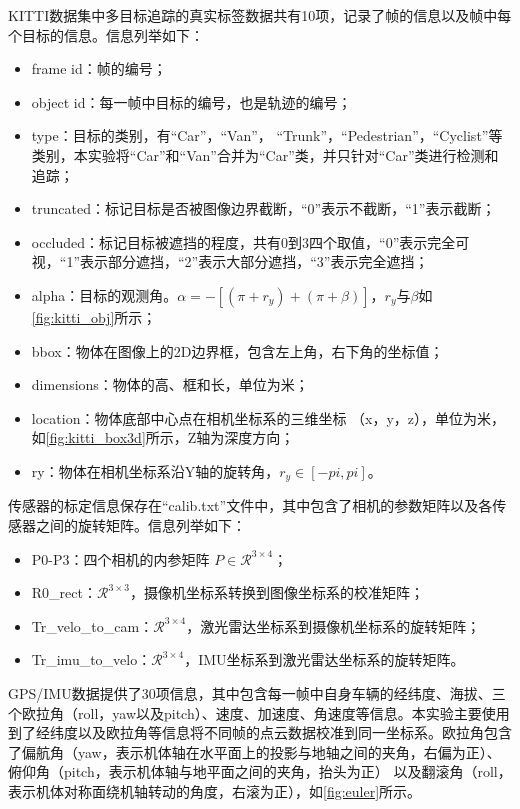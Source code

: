KITTI数据集中多目标追踪的真实标签数据共有10项，记录了帧的信息以及帧中每个目标的信息。信息列举如下：
\begin{itemize}
	\item frame id：帧的编号；
	\item object id：每一帧中目标的编号，也是轨迹的编号；
	\item type：目标的类别，有“Car”，“Van”， “Trunk”，“Pedestrian”，“Cyclist”等类别，本实验将“Car”和“Van”合并为“Car”类，并只针对“Car”类进行检测和追踪；
	\item truncated：标记目标是否被图像边界截断，“0”表示不截断，“1”表示截断；
	\item occluded：标记目标被遮挡的程度，共有0到3四个取值，“0”表示完全可视，“1”表示部分遮挡，“2”表示大部分遮挡，“3”表示完全遮挡；
	\item alpha：目标的观测角。$\alpha = -[(\pi+r_y) + (\pi+\beta)]$，$r_y$与$\beta$如\figurename \ref{fig:kitti_obj}所示；
	\item bbox：物体在图像上的2D边界框，包含左上角，右下角的坐标值；
	\item dimensions：物体的高、框和长，单位为米；
	\item location：物体底部中心点在相机坐标系的三维坐标 （x，y，z），单位为米，如\figurename \ref{fig:kitti_box3d}所示，Z轴为深度方向；
	\item ry：物体在相机坐标系沿Y轴的旋转角，$r_y \in [-pi, pi]$。
\end{itemize}



传感器的标定信息保存在“calib.txt”文件中，其中包含了相机的参数矩阵以及各传感器之间的旋转矩阵。信息列举如下：
\begin{itemize}
	\item P0-P3：四个相机的内参矩阵 $P \in \mathcal{R}^{3\times 4}$；
	\item R0\_rect：$\mathcal{R}^{3\times 3}$，摄像机坐标系转换到图像坐标系的校准矩阵；
	\item Tr\_velo\_to\_cam：$\mathcal{R}^{3\times 4}$，激光雷达坐标系到摄像机坐标系的旋转矩阵；
	\item Tr\_imu\_to\_velo：$\mathcal{R}^{3\times 4}$，IMU坐标系到激光雷达坐标系的旋转矩阵。
\end{itemize}

GPS/IMU数据提供了30项信息，其中包含每一帧中自身车辆的经纬度、海拔、三个欧拉角（roll，yaw以及pitch）、速度、加速度、角速度等信息。本实验主要使用到了经纬度以及欧拉角等信息将不同帧的点云数据校准到同一坐标系。欧拉角包含了偏航角（yaw，表示机体轴在水平面上的投影与地轴之间的夹角，右偏为正）、俯仰角（pitch，表示机体轴与地平面之间的夹角，抬头为正） 以及翻滚角（roll，表示机体对称面绕机轴转动的角度，右滚为正），如\figurename \ref{fig:euler}所示。

